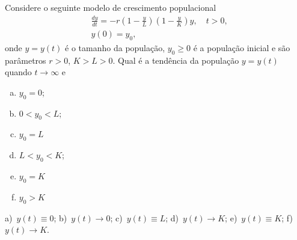 \begin{exer}
  Considere o seguinte modelo de crescimento populacional
  \begin{align*}
    &\frac{dy}{dt} = -r\left(1 - \frac{y}{L}\right)\left(1 - \frac{y}{K}\right)y,\quad t>0,\\
    &y(0) = y_0,
  \end{align*}
  onde $y = y(t)$ é o tamanho da população, $y_0 \geq 0$ é a população inicial e são parâmetros $r > 0$, $K>L>0$. Qual é a tendência da população $y = y(t)$ quando $t\to\infty$ e
  \begin{enumerate}[a)]
  \item $y_0 = 0$;
  \item $0 < y_0 < L$;
  \item $y_0 = L$
  \item $L < y_0 < K$;
  \item $y_0 = K$
  \item $y_0 > K$
  \end{enumerate}
\end{exer}
\begin{resp}
  a)~$y(t) \equiv 0$; b)~$y(t)\to 0$; c)~$y(t)\equiv L$; d)~$y(t)\to K$; e)~$y(t)\equiv K$; f)~$y(t)\to K$.
\end{resp}

